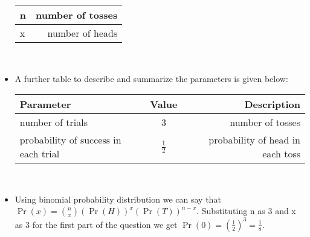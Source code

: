 \documentclass{article}
\begin{document}
\begin{itemize}
\begin{tabular}{|l|r|}
			n & number of tosses\\
			\hline
			x & number of heads\\
			\hline
		\end{tabular}\\[4pt]
  \item A further table to describe and summarize the parameters is given below:\\[4pt]
  \begin{tabular}{|l|c|r|}
  \hline
  Parameter & Value & Description\\
  \hline
  number of trials & 3 & number of tosses\\
  \hline
  probability of success in each trial & $\frac{1}{2}$ &  probability of head in each toss\\[3pt]
 \hline
 \end{tabular}\\[4pt]
		\item Using binomial probability distribution we can say that $\Pr(x)={n\choose x}(\Pr(H))^x(\Pr(T))^{n-x}$. Substituting n as 3 and x as 3 for the first part of the question we get $\Pr(0)=(\frac{1}{2})^3=\frac{1}{8}$.
	\end{itemize}
	
\end{document}
